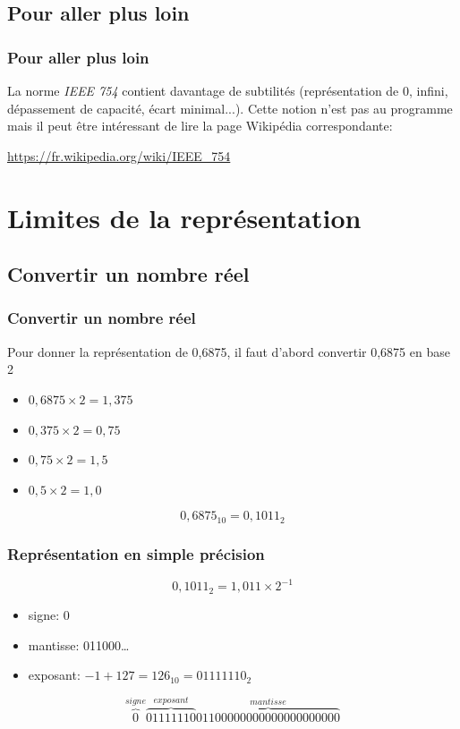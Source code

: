 \documentclass[svgnames,11pt]{beamer}
\begin{document}
\subsection{Pour aller plus loin}
\begin{frame}
    \frametitle{Pour aller plus loin}

    La norme \emph{IEEE 754} contient davantage de subtilités (représentation de 0, infini, dépassement de capacité, écart minimal...). Cette notion n'est pas au programme mais il peut être intéressant de lire la page Wikipédia correspondante:
\begin{center}
\url{https://fr.wikipedia.org/wiki/IEEE_754}
\end{center} 

\end{frame}
\section{Limites de la représentation}
\subsection{Convertir un nombre réel}
\begin{frame}
    \frametitle{Convertir un nombre réel}

    Pour donner la représentation de 0,6875, il faut d'abord convertir 0,6875 en base 2
    \begin{itemize}
        \item $0,6875×2 = 1,375$
        \item $0,375×2=0,75$
        \item $0,75×2=1,5$
        \item $0,5×2=1,0$
    \end{itemize}
$$0,6875_{10}=0,1011_2$$
\end{frame}
\begin{frame}
    \frametitle{Représentation en simple précision}

    {\LARGE$$0,1011_2=1,011×2^{-1}$$}
    \begin{itemize}
        \item signe: 0
        \item mantisse: 011000\dots
        \item exposant: $-1+127=126_{10}=01111110_2$
    \end{itemize}
    \bigskip
    $$\overbrace{0}^{signe}\overbrace{01111110}^{exposant}\overbrace{01100000000000000000000}^{mantisse}$$
\end{frame}
\end{document}
